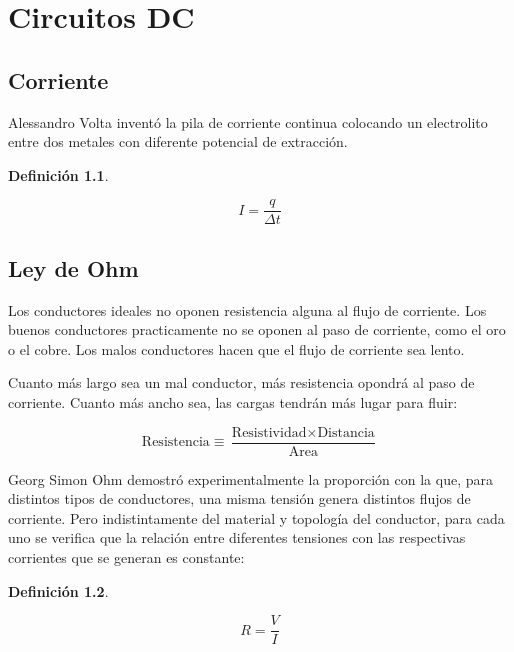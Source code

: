 \documentclass[a5paper,12pt,twoside]{book}
\newtheorem{defn}{{Definición}}[chapter]
\begin{document}
\chapter{Circuitos DC}
\renewcommand{\voltage}{V}
\renewcommand{\current}{I}

\section{Corriente}

Alessandro Volta inventó la pila de corriente continua colocando un electrolito entre dos metales con diferente potencial de extracción.

\begin{mdframed}[style=MyFrame1]
    \begin{defn}
    \end{defn}
    \begin{equation*}
        I = \frac{q}{\Delta t}
    \end{equation*}
\end{mdframed}


\section{Ley de Ohm}

Los conductores ideales no oponen resistencia alguna al flujo de corriente. Los buenos conductores practicamente no se oponen al paso de corriente, como el oro o el cobre. Los malos conductores hacen que el flujo de corriente sea lento.

Cuanto más largo sea un mal conductor, más resistencia opondrá al paso de corriente. Cuanto más ancho sea, las cargas tendrán más lugar para fluir:

\begin{equation*}
    \text{Resistencia} \equiv \frac{\text{Resistividad} \times \text{Distancia}}{\text{Area}}
\end{equation*}

Georg Simon Ohm demostró experimentalmente la proporción con la que, para distintos tipos de conductores, una misma tensión genera distintos flujos de corriente. Pero indistintamente del material y topología del conductor, para cada uno se verifica que la relación entre diferentes tensiones con las respectivas corrientes que se generan es constante:

\begin{mdframed}[style=MyFrame1]
    \begin{defn}
    \end{defn}
    \begin{equation*}
        R = \frac{V}{I}
    \end{equation*}
\end{mdframed}
\end{document}
